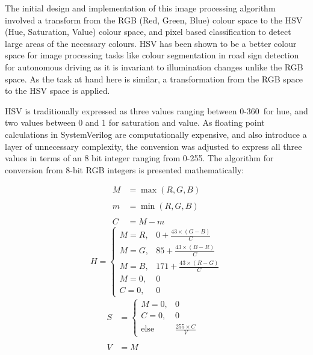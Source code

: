 \documentclass[a4paper]{article}
\begin{document}


The initial design and implementation of this image processing algorithm involved
a transform from the RGB (Red, Green, Blue) colour space to the HSV (Hue, 
Saturation, Value) colour space, and pixel based classification to detect large
areas of the necessary colours.  HSV has been shown to be a better colour space
for image processing tasks like colour segmentation in road sign detection for 
autonomous driving as it is invariant to illumination changes unlike the RGB 
space.\cite{ali2013performance} As the task at hand here is similar, a transformation
from the RGB space to the HSV space is applied. 

HSV is traditionally expressed as three values ranging between 0-360\degree\  
for hue, and two values between 0 and 1 for saturation and value.\cite{10.1145/965139.807361}
As floating point calculations in SystemVerilog are computationally expensive, 
and also introduce a layer of unnecessary complexity, the conversion was adjusted
to express all three values in terms of an 8 bit integer ranging from 0-255. The
algorithm for conversion from 8-bit RGB integers is presented mathematically:

\begin{multicols}{3}
    \noindent
    \begin{align*}
        M &= \max(R, G, B) \\ \\
        m &= \min(R, G, B) \\ \\
        C &= M-m 
    \end{align*}
    \begin{equation*}
        H = \begin{cases}
            M = R, & 0 + \frac{43 \times (G-B)}{C} \\
            M = G, & 85 + \frac{43 \times (B-R)}{C} \\
            M = B, & 171 + \frac{43 \times (R-G)}{C} \\
            M = 0, & 0 \\
            C = 0, & 0
        \end{cases} 
    \end{equation*}
    \begin{align*}
        S &= \begin{cases}
            M = 0, & 0 \\ C = 0, & 0 \\ \text{else} & \frac{255\times C}{V}
        \end{cases} & \\ \\
         V &= M  
    \end{align*}
\end{multicols}
\end{document}
